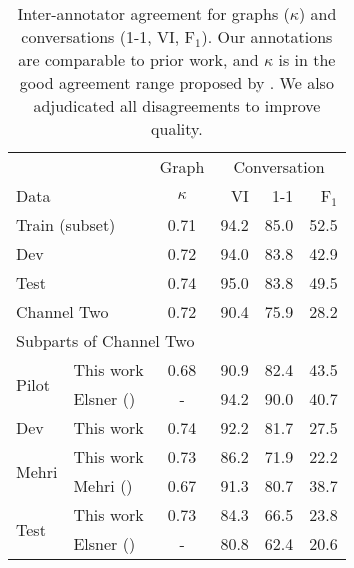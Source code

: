 \documentclass[11pt,a4paper]{article}
\begin{document}
\begin{table}
    \centering
    \setlength{\tabcolsep}{4pt}
    \begin{tabular}{llcrrr}
        \toprule
                                                               &  & Graph & \multicolumn{3}{c}{Conversation} \\
            \multicolumn{2}{l}{Data}                            & $\kappa$ &   VI &  1-1 & F$_1$ \\
        \midrule                                                                        
            \multicolumn{2}{l}{Train (subset)}                      & 0.71 & 94.2 & 85.0 & 52.5 \\
            \multicolumn{2}{l}{Dev}                                 & 0.72 & 94.0 & 83.8 & 42.9 \\
            \multicolumn{2}{l}{Test}                                & 0.74 & 95.0 & 83.8 & 49.5 \\
            \multicolumn{2}{l}{Channel Two}                           & 0.72 & 90.4 & 75.9 & 28.2 \\
        \midrule
            \multicolumn{6}{l}{Subparts of Channel Two} \\
            \cmidrule(l){2-6}
            \multirow{2}{*}{Pilot} & This work                            & 0.68 & 90.9 & 82.4 & 43.5 \\
                                   & Elsner (\citeyear{elsner:2008})      &    - & 94.2 & 90.0 & 40.7 \\
            \cmidrule(l){2-6}
            Dev                    & This work                            & 0.74 & 92.2 & 81.7 & 27.5 \\
            \cmidrule(l){2-6}
            \multirow{2}{*}{Mehri} & This work                            & 0.73 & 86.2 & 71.9 & 22.2 \\
                                   & Mehri (\citeyear{Mehri:2017:IJCNLP}) & 0.67 & 91.3 & 80.7 & 38.7 \\
            \cmidrule(l){2-6}
            \multirow{2}{*}{Test}  & This work                            & 0.73 & 84.3 & 66.5 & 23.8 \\
                                   & Elsner (\citeyear{elsner:2008})      &    - & 80.8 & 62.4 & 20.6 \\
        \bottomrule
    \end{tabular}
    \caption{\label{tab:agreement}
      Inter-annotator agreement for graphs ($\kappa$) and conversations (1-1, VI, F$_1$).
      Our annotations are comparable to prior work, and $\kappa$ is in the good agreement range proposed by \citet{altman:1990}.
      We also adjudicated all disagreements to improve quality.
    }
\end{table}
\end{document}
